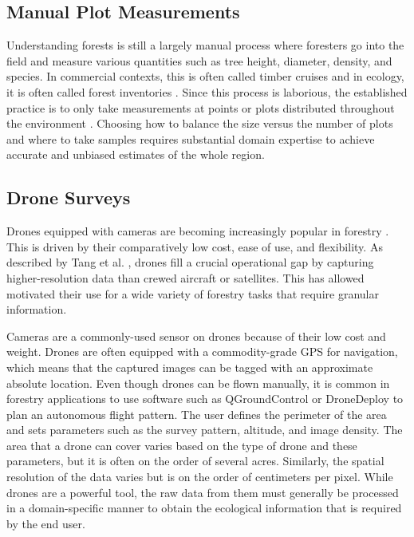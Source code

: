 \subsection{Manual Plot Measurements}
Understanding forests is still a largely manual process where foresters go into the field and measure various quantities such as tree height, diameter, density, and species. In commercial contexts, this is often called timber cruises \cite{ServiceFSHHANDBOOK} and in ecology, it is often called forest inventories \cite{USForestServiceDepartmentofAgriculture2016FORESTPLOTS}. Since this process is laborious, the established practice is to only take measurements at points or plots distributed throughout the environment \cite{Town2018ForestryMethods}. Choosing how to balance the size versus the number of plots and where to take samples requires substantial  domain expertise to achieve accurate and unbiased estimates of the whole region.

\subsection{Drone Surveys}
Drones equipped with cameras are becoming increasingly popular in forestry \cite{CristanDronesManagementEdited,Tang2015DronePractices}. This is driven by their comparatively low cost, ease of use, and flexibility. As described by Tang et al. \cite{Tang2015DronePractices}, drones fill a crucial operational gap by capturing higher-resolution data than crewed aircraft or satellites. This has allowed motivated their use for a wide variety of forestry tasks that require granular information.

Cameras are a commonly-used sensor on drones because of their low cost and weight. Drones are often equipped with a commodity-grade GPS for navigation, which means that the captured images can be tagged with an approximate absolute location. Even though drones can be flown manually, it is common in forestry applications to use software such as QGroundControl \cite{QGroundControl} or DroneDeploy \cite{DroneDeploy} to plan an autonomous flight pattern. The user defines the perimeter of the area and sets parameters such as the survey pattern, altitude, and image density. The area that a drone can cover varies based on the type of drone and these parameters, but it is often on the order of several acres. Similarly, the spatial resolution of the data varies but is on the order of centimeters per pixel.  While drones are a powerful tool, the raw data from them must generally be processed in a domain-specific manner to obtain the ecological information that is required by the end user.  

